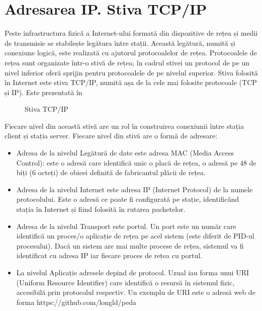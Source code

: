 \section{Adresarea IP. Stiva TCP/IP}
\label{sec:net:tcp-ip}

Peste infrastructura fizică a Internet-ului formată din dispozitive de rețea și medii de transmisie se stabilește legătura între stații. Această legătură, numită și conexiune logică, este realizată cu ajutorul protocoalelor de rețea. Protocoalele de rețea sunt organizate într-o stivă de rețea; în cadrul stivei un protocol de pe un nivel inferior oferă sprijin pentru protocoalele de pe nivelul superior. Stiva folosită în Internet este stiva TCP/IP, numită așa de la cele mai folosite protocoale (TCP și IP). Este prezentată în 

\begin{figure}[htbp]
  \centering
  \def\svgwidth{\columnwidth}
  
  \caption{Stiva TCP/IP}
  \label{fig:net:tcp-ip-stack}
\end{figure}

Fiecare nivel din această stivă are un rol în construirea conexiunii între stația client și stația server. Fiecare nivel din stivă are o formă de adresare:

\begin{itemize}
  \item Adresa de la nivelul Legătură de date este adresa MAC (Media Access Control): este o adresă care identifică unic o placă de rețea, o adresă pe 48 de biți (6 octeți) de obicei definită de fabricantul plăcii de rețea.
  \item Adresa de la nivelul Internet este adresa IP (Internet Protocol) de la numele protocolului. Este o adresă ce poate fi configurată pe stație, identificând stația în Internet și fiind folosită în rutarea pachetelor.
  \item Adresa de la nivelul Transport este portul. Un port este un număr care identifică un proces/o aplicație de rețea pe acel sistem (este diferit de PID-ul procesului). Dacă un sistem are mai multe procese de rețea, sistemul va fi identificat cu adresa IP iar fiecare proces de rețea cu portul.
  \item La nivelul Aplicație adresele depind de protocol. Uzual iau forma unui URI (Uniform Resource Identifier) care identifică o resursă în sistemul fizic, accesibilă prin protocolul respectiv. Un exemplu de URI este o adresă web de forma https://github.com/longld/peda
\end{itemize}

